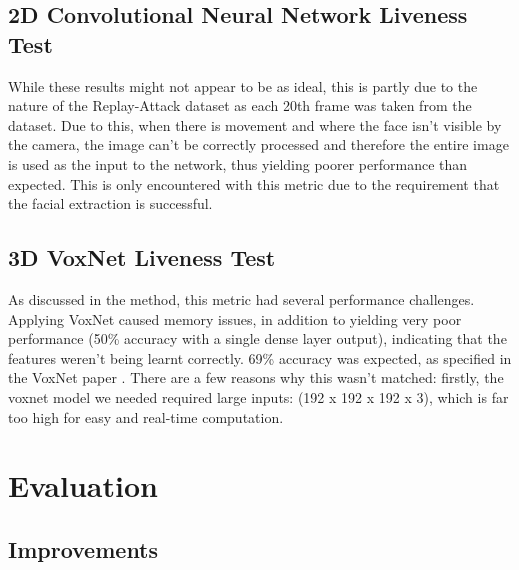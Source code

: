 \documentclass[10pt,a4paper]{article}
\begin{document}


    \subsection{2D Convolutional Neural Network Liveness Test}
        \todo{}

        While these results might not appear to be as ideal, this is partly due to the nature of the Replay-Attack dataset as each 20th frame was taken from the dataset.
        Due to this, when there is movement and where the face isn't visible by the camera, the image can't be correctly processed and therefore the entire image is used
        as the input to the network, thus yielding poorer performance than expected. This is only encountered with this metric due to the requirement that the facial extraction is successful. 
        
    \subsection{3D VoxNet Liveness Test}
            As discussed in the method, this metric had several performance challenges. Applying VoxNet caused memory issues, in addition to yielding very poor performance
            (50\% accuracy with a single dense layer output), indicating that the features weren't being learnt correctly. 69\% accuracy was expected, as specified in the
            VoxNet paper \cite{VoxNetModel}. There are a few reasons why this wasn't matched: firstly, the voxnet model we needed required large inputs: (192 x 192 x 192 x 3),
            which is far too high for easy and real-time computation. 

\section{Evaluation}
    \subsection{Improvements}
\end{document}
